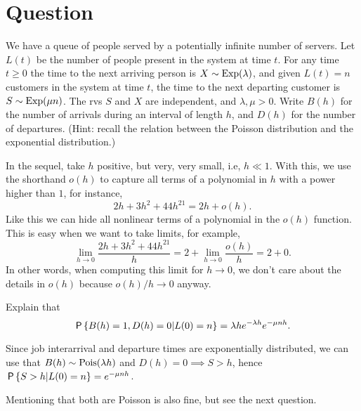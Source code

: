 \section{Question}


We have a queue of people served by a potentially infinite number of servers. Let $L(t)$ be the number of people present in the system at time $t$.
For any time $t\geq 0$ the time to the next arriving person is $X\sim\Exp{\lambda}$, and given $L(t)=n$ customers in the system at time $t$, the time to the next departing customer is $S\sim\Exp{\mu n}$. The rvs $S$ and $X$ are independent, and $\lambda, \mu > 0$. Write $B(h)$ for the number of arrivals during an interval of length $h$, and $D(h)$ for the number of departures. (Hint: recall the relation between the Poisson distribution and the exponential distribution.)

In the sequel, take $h$ positive, but very, very small, i.e, $h\ll 1$. With this, we use the shorthand $o(h)$ to capture all terms of a polynomial in $h$ with a power higher than $1$, for instance,
\begin{equation}
  2h + 3 h^2+ 44 h^{21} = 2h + o(h).
\end{equation}
Like this we can hide all nonlinear terms of a polynomial  in the $o(h)$ function. This is easy when we want to take limits, for example,
\begin{equation}
  \lim_{h\to 0} \frac{2h + 3h^{2} + 44 h^{21}} h
= 2 +  \lim_{h\to 0} \frac{o(h)} h  = 2 + 0.
\end{equation}
In other words, when computing this limit for $h\to 0$, we don't care about the details in $o(h)$ because $o(h)/h\to0$ anyway.

\begin{exercise}[1]
Explain that
\begin{equation}
\P{B(h)=1, D(h)=0|L(0) = n } = \lambda h e^{-\lambda h} e^{-\mu n h}.
\end{equation}
\begin{solution}
  Since job interarrival and departure times are exponentially distributed, we can use that $B(h) \sim \Pois{\lambda h}$ and $D(h) = 0 \implies S > h$, hence $\P{S>h|L(0) = n} = e^{-\mu n h}$.

Mentioning that both are Poisson is also fine, but see the next question.
\end{solution}
\end{exercise}

